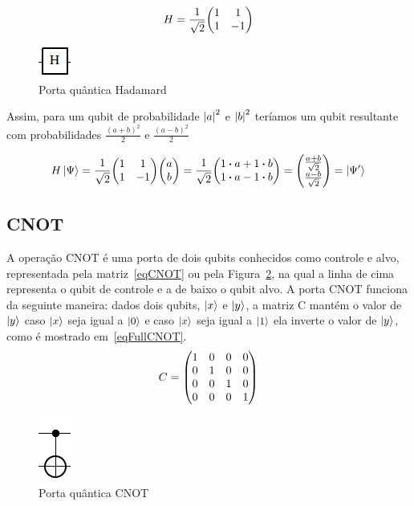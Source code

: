 \documentclass[a4paper, 12pt, oneside]{book}
\begin{document}
\begin{equation}\label{eqH}
H =  \frac{1}{\sqrt{2}}\mqty(1&1\\1&-1)
\end{equation}

\begin{figure}[H]
\centering
\includegraphics[scale=0.75]{h.jpg}
\caption{Porta quântica Hadamard}
\label{fig:H}
\end{figure}

Assim, para um qubit de probabilidade $\abs{a}^2$ e $\abs{b}^2$ teríamos um qubit resultante com probabilidades $\frac{(a+b)^2}{2}$ e $\frac{(a-b)^2}{2}$

\begin{equation}
H\ket{\Psi} = \frac{1}{\sqrt{2}}\mqty(1&1\\1&-1)\mqty(a\\b) = \frac{1}{\sqrt{2}}\mqty(1 \vdot a+1 \vdot b \\1 \vdot a-1 \vdot b) = \mqty( \frac{a+b}{\sqrt{2}} \\ \frac{a-b}{\sqrt{2}} ) = \ket{\Psi'}
\end{equation}

\subsection{CNOT} \label{sec:cnot}
A operação CNOT é uma porta de dois qubits conhecidos como controle e alvo, representada pela matriz~\eqref{eqCNOT} ou pela Figura~\ref{fig:CNOT}, na qual a linha de cima representa o qubit de controle e a de baixo o qubit alvo. A porta CNOT funciona da seguinte maneira: dados dois qubits, $\ket{x}$ e $\ket{y}$, a matriz C mantém o valor de $\ket{y}$ caso $\ket{x}$ seja igual a $\ket{0}$ e caso $\ket{x}$ seja igual a $\ket{1}$ ela inverte o valor de $\ket{y}$, como é mostrado em~\eqref{eqFullCNOT}.
\begin{equation}\label{eqCNOT}
C =  \mqty(1&0&0&0\\0&1&0&0\\0&0&1&0\\0&0&0&1)
\end{equation}

\begin{figure}[H]
\centering
\includegraphics[scale=0.80]{cnot.png}
\caption{Porta quântica CNOT}
\label{fig:CNOT}
\end{figure}
\end{document}
